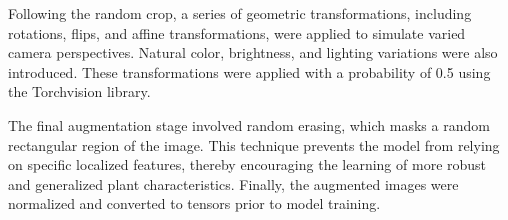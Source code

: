 \documentclass[final,3p,times,twocolumn]{elsarticle}
\begin{document}
Following the random crop, a series of geometric transformations, including rotations, flips, and affine transformations, were applied to simulate varied camera perspectives. Natural color, brightness, and lighting variations were also introduced. These transformations were applied with a probability of 0.5 using the Torchvision library. 

The final augmentation stage involved random erasing, which masks a random rectangular region of the image. This technique prevents the model from relying on specific localized features, thereby encouraging the learning of more robust and generalized plant characteristics. Finally, the augmented images were normalized and converted to tensors prior to model training.



\end{document}
